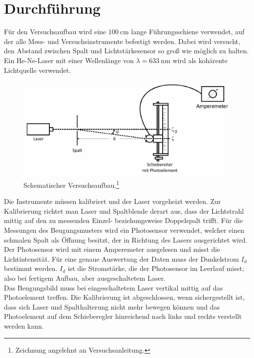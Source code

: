\section{Durchführung}
\label{sec:Durchführung}

Für den Versuchsaufbau wird eine $\SI{100}{\centi\meter}$ lange Führungsschiene verwendet, auf der alle Mess- und Versuchsinstrumente befestigt werden.
Dabei wird versucht, den Abstand zwischen Spalt und Lichtstärkesensor so groß wie möglich zu halten.
Ein He-Ne-Laser mit einer Wellenlänge von $\lambda = \SI{633}{\nano\meter}$ wird als kohärente Lichtquelle verwendet.

\begin{figure}
    \centering
    \includegraphics[width=\textwidth]{plots/Versuchsaufbau.png}
    \caption{Schematischer Versuchsaufbau.\footnote{Zeichnung angelehnt an Versuchsanleitung.\cite{Versuchsanleitung}}}
    \label{fig:schemAufbau}
\end{figure}

\FloatBarrier

Die Instrumente müssen kalibriert und der Laser vorgeheizt werden.
Zur Kalibrierung richtet man Laser und Spaltblende derart aus, dass der Lichtstrahl mittig auf den zu messenden Einzel- beziehungsweise Doppelspalt trifft.
Für die Messungen des Beugungsmusters wird ein Photosensor verwendet, welcher einen schmalen Spalt als Öffnung besitzt, der in Richtung des Lasers ausgerichtet wird.
Der Photosensor wird mit einem Amperemeter ausgelesen und misst die Lichtintensität. Für eine genaue Auswertung der Daten muss der Dunkelstrom $I_d$ bestimmt werden.
$I_d$ ist die Stromstärke, die der Photosensor im Leerlauf misst; also bei fertigem Aufbau, aber ausgeschaltetem Laser.\\
Das Beugungsbild muss bei eingeschaltetem Laser vertikal mittig auf das Photoelement treffen.
Die Kalibrierung ist abgeschlossen, wenn sichergestellt ist, dass sich Laser und Spalthalterung nicht mehr bewegen können und das Photoelement auf dem Schieberegler hinreichend nach links
und rechts verstellt werden kann.\\

